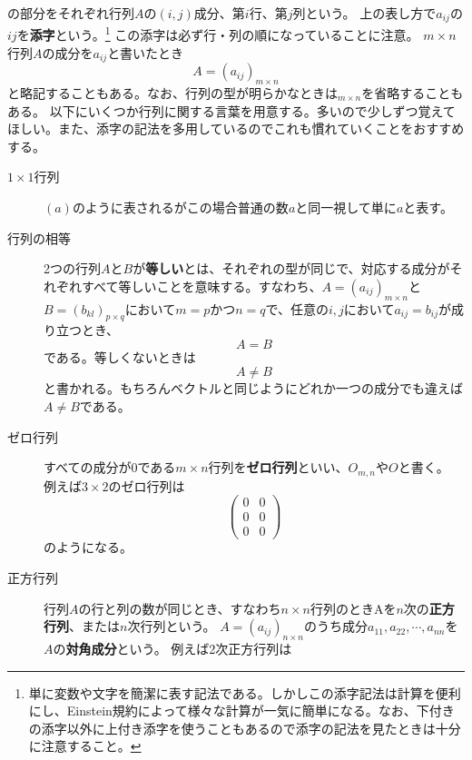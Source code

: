 \documentclass[10pt]{jsarticle}
\theoremstyle{definition}%
\numberwithin{equation}{section}%
\begin{document}
の部分をそれぞれ行列$A$の$(i,j)$成分、第$i$行、第$j$列という。
上の表し方で$a_{ij}$の$ij$を{\bf 添字}という。\footnote{単に変数や文字を簡潔に表す記法である。しかしこの添字記法は計算を便利にし、Einstein規約によって様々な計算が一気に簡単になる。なお、下付きの添字以外に上付き添字を使うこともあるので添字の記法を見たときは十分に注意すること。}
この添字は必ず行・列の順になっていることに注意。
$m\times n$行列$A$の成分を$a_{ij}$と書いたとき
\begin{equation}
  A=(a_{ij})_{m\times n}
\end{equation}
と略記することもある。なお、行列の型が明らかなときは${}_{m\times n}$を省略することもある。
以下にいくつか行列に関する言葉を用意する。多いので少しずつ覚えてほしい。また、添字の記法を多用しているのでこれも慣れていくことをおすすめする。
\begin{framed}
\begin{description}
  \item[$1\times 1$行列] $(a)$のように表されるがこの場合普通の数$a$と同一視して単に$a$と表す。
  \item[行列の相等] 2つの行列$A$と$B$が{\bf 等しい}とは、それぞれの型が同じで、対応する成分がそれぞれすべて等しいことを意味する。すなわち、$A=(a_{ij})_{m\times n}$と$B=(b_{kl})_{p\times q}$において$m=p$かつ$n=q$で、任意の$i,j$において$a_{ij}=b_{ij}$が成り立つとき、
  \begin{equation}
    A=B
  \end{equation}
  である。等しくないときは
  \begin{equation}
  A\neq B 
  \end{equation}
  と書かれる。もちろんベクトルと同じようにどれか一つの成分でも違えば$A\neq B$である。
  \item[ゼロ行列] すべての成分が0である$m\times n$行列を{\bf ゼロ行列}といい、$O_{m,n}$や$O$と書く。
  例えば$3\times 2$のゼロ行列は
  \begin{equation}\left( 
    \begin{matrix}
      0 & 0\\
      0 & 0\\
      0 & 0
    \end{matrix}\right) 
  \end{equation}
  のようになる。
  \item[正方行列] 行列$A$の行と列の数が同じとき、すなわち$n\times n$行列のときAを$n$次の{\bf 正方行列}、または$n$次行列という。
 $A=(a_{ij})_{n\times n}$のうち成分$a_{11},a_{22},\cdots,a_{nn}$を$A$の{\bf 対角成分}という。
  例えば2次正方行列は
   \begin{equation}

\end{equation}
\end{description}
\end{framed}
\end{document}
